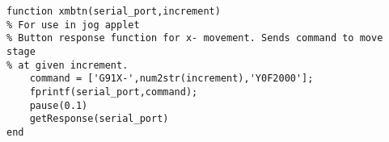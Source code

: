 \begin{lstlisting}
function xmbtn(serial_port,increment)
% For use in jog applet
% Button response function for x- movement. Sends command to move stage
% at given increment.
    command = ['G91X-',num2str(increment),'Y0F2000'];
    fprintf(serial_port,command);
    pause(0.1)
    getResponse(serial_port)
end

\end{lstlisting}